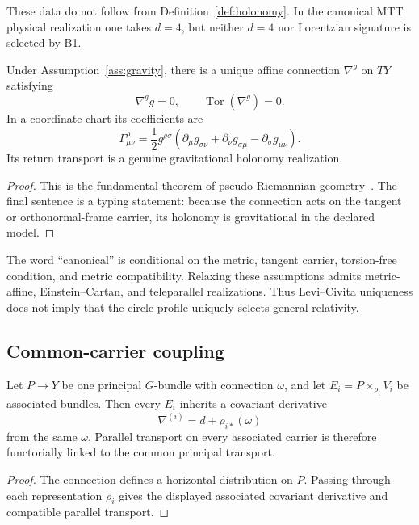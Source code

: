 \documentclass[11pt]{article}
\begin{document}
These data do not follow from Definition~\ref{def:holonomy}.  In the canonical
MTT physical realization one takes $d=4$, but neither $d=4$ nor Lorentzian
signature is selected by B1.

\begin{theorem}
\label{thm:levi-civita}
Under Assumption~\ref{ass:gravity}, there is a unique affine connection
$\nabla^g$ on $TY$ satisfying
\[
 \nabla^g g=0,\qquad
 \operatorname{Tor}(\nabla^g)=0.
\]
In a coordinate chart its coefficients are
\[
 \Gamma^\rho_{\mu\nu}
 =\frac12 g^{\rho\sigma}
 \left(
 \partial_\mu g_{\sigma\nu}
 +\partial_\nu g_{\sigma\mu}
 -\partial_\sigma g_{\mu\nu}
 \right).
\]
Its return transport is a genuine gravitational holonomy realization.
\end{theorem}

\begin{proof}
This is the fundamental theorem of pseudo-Riemannian
geometry~\cite{O'Neill,Wald}.  The final sentence is a typing statement:
because the connection acts on the tangent or orthonormal-frame carrier, its
holonomy is gravitational in the declared model.
\end{proof}

The word ``canonical'' is conditional on the metric, tangent carrier,
torsion-free condition, and metric compatibility.  Relaxing these assumptions
admits metric-affine, Einstein--Cartan, and teleparallel realizations.  Thus
Levi--Civita uniqueness does not imply that the circle profile uniquely
selects general relativity.

\subsection{Common-carrier coupling}

\begin{proposition}
\label{prop:associated}
Let $P\to Y$ be one principal $G$-bundle with connection $\omega$, and let
$E_i=P\times_{\rho_i}V_i$ be associated bundles.  Then every $E_i$ inherits a
covariant derivative
\[
 \nabla^{(i)}=d+\rho_{i*}(\omega)
\]
from the same $\omega$.  Parallel transport on every associated carrier is
therefore functorially linked to the common principal transport.
\end{proposition}

\begin{proof}
The connection defines a horizontal distribution on $P$.  Passing through
each representation $\rho_i$ gives the displayed associated covariant
derivative and compatible parallel transport.
\end{proof}
\end{document}
